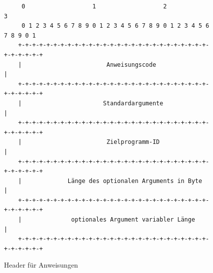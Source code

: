\begin{figure}[h]
\begin{lstlisting}
     0                   1                   2                   3
     0 1 2 3 4 5 6 7 8 9 0 1 2 3 4 5 6 7 8 9 0 1 2 3 4 5 6 7 8 9 0 1
    +-+-+-+-+-+-+-+-+-+-+-+-+-+-+-+-+-+-+-+-+-+-+-+-+-+-+-+-+-+-+-+-+
    |                        Anweisungscode                         |
    +-+-+-+-+-+-+-+-+-+-+-+-+-+-+-+-+-+-+-+-+-+-+-+-+-+-+-+-+-+-+-+-+
    |                       Standardargumente                       |
    +-+-+-+-+-+-+-+-+-+-+-+-+-+-+-+-+-+-+-+-+-+-+-+-+-+-+-+-+-+-+-+-+
    |                        Zielprogramm-ID                        |
    +-+-+-+-+-+-+-+-+-+-+-+-+-+-+-+-+-+-+-+-+-+-+-+-+-+-+-+-+-+-+-+-+
    |             Länge des optionalen Arguments in Byte            |
    +-+-+-+-+-+-+-+-+-+-+-+-+-+-+-+-+-+-+-+-+-+-+-+-+-+-+-+-+-+-+-+-+
    |              optionales Argument variabler Länge              |
    +-+-+-+-+-+-+-+-+-+-+-+-+-+-+-+-+-+-+-+-+-+-+-+-+-+-+-+-+-+-+-+-+
\end{lstlisting}
\caption{Header für Anweisungen}
\label{Anweisungs_Header}
\end{figure}

